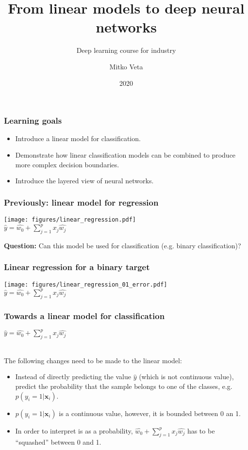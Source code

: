 \documentclass[notes]{beamer}          %
\title{From linear models to deep neural networks}
\subtitle{Deep learning course for industry }
\author{Mitko Veta}
\institute{Eindhoven University of Technology

Department of Biomedical Engineering}
\date{2020}
\begin{document}
 
\frame{\titlepage}


\begin{frame}
\frametitle{Learning goals}
\begin{itemize}
    \item Introduce a linear model for classification.
    \item Demonstrate how linear classification models can be combined to produce more complex decision boundaries. 
    \item Introduce the layered view of neural networks.
\end{itemize}
\end{frame}

\begin{frame}
\frametitle{Previously: linear model for regression}
\begin{center}
\texttt{[image: figures/linear\_regression.pdf]} \\
$\hat{y} = \hat{w_0} + \sum_{j=1}^{p} x_j \hat{w_j}$
\end{center}
\textbf{Question:} Can this model be used for classification (e.g. binary classification)?
\end{frame}

\begin{frame}
\frametitle{Linear regression for a binary target}
\begin{center}
\texttt{[image: figures/linear\_regression\_01\_error.pdf]} \\
$\hat{y} = \hat{w_0} + \sum_{j=1}^{p} x_j \hat{w_j}$
\end{center}
\end{frame}


\begin{frame}
\frametitle{Towards a linear model for classification}

\begin{center}
$\hat{y} = \hat{w_0} + \sum_{j=1}^{p} x_j \hat{w_j}$ \\~\
\end{center}

The following changes need to be made to the linear model:
\begin{itemize}
  \item Instead of directly predicting the value $\hat{y}$ (which is not continuous value), predict the probability that the sample belongs to one of the classes, e.g. $p(y_i = 1 \vert \mathbf{x}_i)$.
  \pause
  \item $p(y_i = 1 \vert \mathbf{x}_i)$ is a continuous value, however, it is bounded between 0 an 1. 
  \item In order to interpret is as a probability, $\hat{w_0} + \sum_{j=1}^{p} x_j \hat{w_j}$  has to be ``squashed'' between 0 and 1.
\end{itemize}
\end{frame}
\end{document}
